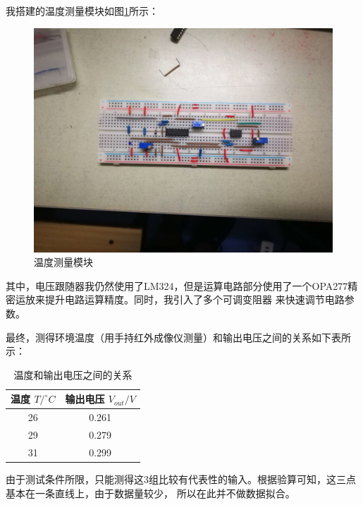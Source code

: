 \documentclass{article}
\begin{document}
\begin{spacing}{1.5}
\begin{enumerate}
    我搭建的温度测量模块如图\ref{fig:module3}所示：
    \begin{figure}[H]
        \centering
        \includegraphics[scale=0.1]{fig/result/module3.png}
        \caption{温度测量模块}
        \label{fig:module3}
    \end{figure}
    
    其中，电压跟随器我仍然使用了LM324，但是运算电路部分使用了一个OPA277精密运放来提升电路运算精度。同时，我引入了多个可调变阻器
    来快速调节电路参数。

    最终，测得环境温度（用手持红外成像仪测量）和输出电压之间的关系如下表所示：

    \begin{table}[H]
        \centering
        \renewcommand\arraystretch{2}   %
        \begin{tabular}{cc}
        \toprule
            温度 $T / ^{\circ}C$ &  输出电压 $V_{out} / V$\\
        \midrule
             26 & 0.261 \\ 
             29 & 0.279 \\ 
             31 & 0.299 \\ 
        \bottomrule
        \end{tabular}
        \caption{温度和输出电压之间的关系}
        \label{tab:module3_result}
    \end{table}
    
    由于测试条件所限，只能测得这3组比较有代表性的输入。根据验算可知，这三点基本在一条直线上，由于数据量较少，
    所以在此并不做数据拟合。


\end{enumerate}
\end{spacing}
\end{document}
